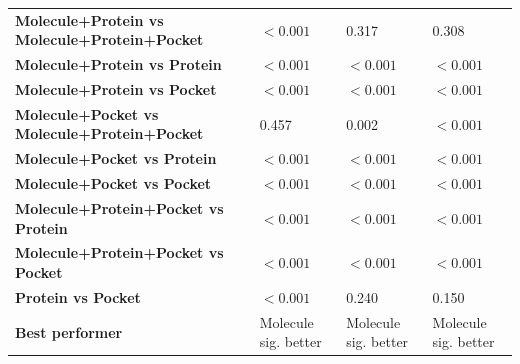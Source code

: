 \begin{table}[H]
{\begin{tabular}{llll}
        \textbf{Molecule+Protein vs Molecule+Protein+Pocket} & $< 0.001$ & 0.317 & 0.308 \\
        \textbf{Molecule+Protein vs Protein} & $< 0.001$ & $< 0.001$ & $< 0.001$ \\
        \textbf{Molecule+Protein vs Pocket} & $< 0.001$ & $< 0.001$ & $< 0.001$ \\
        \textbf{Molecule+Pocket vs Molecule+Protein+Pocket} & 0.457 & 0.002 & $< 0.001$ \\
        \textbf{Molecule+Pocket vs Protein} & $< 0.001$ & $< 0.001$ & $< 0.001$ \\
        \textbf{Molecule+Pocket vs Pocket} & $< 0.001$ & $< 0.001$ & $< 0.001$ \\
        \textbf{Molecule+Protein+Pocket vs Protein} & $< 0.001$ & $< 0.001$ & $< 0.001$ \\
        \textbf{Molecule+Protein+Pocket vs Pocket} & $< 0.001$ & $< 0.001$ & $< 0.001$ \\
        \textbf{Protein vs Pocket} & $< 0.001$ & 0.240 & 0.150 \\
        \textbf{Best performer} & Molecule sig. better & Molecule sig. better & Molecule sig. better \\
        \bottomrule
    \end{tabular}}
\end{table}